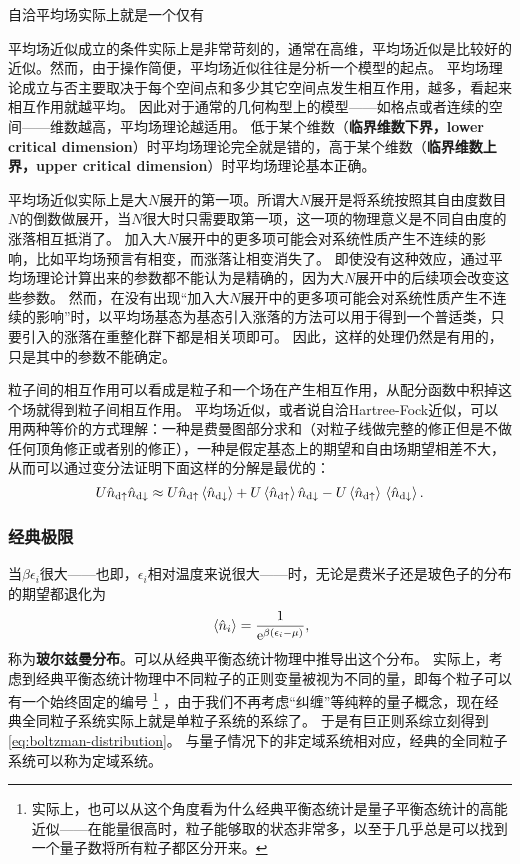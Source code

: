 \documentclass[hyperref, UTF8, a4paper]{ctexart}
\newcommand*{\ee}{\mathrm{e}}
\begin{document}
自洽平均场实际上就是一个仅有 %

平均场近似成立的条件实际上是非常苛刻的，通常在高维，平均场近似是比较好的近似。然而，由于操作简便，平均场近似往往是分析一个模型的起点。
平均场理论成立与否主要取决于每个空间点和多少其它空间点发生相互作用，越多，看起来相互作用就越平均。
因此对于通常的几何构型上的模型——如格点或者连续的空间——维数越高，平均场理论越适用。
低于某个维数（\textbf{临界维数下界，lower critical dimension}）时平均场理论完全就是错的，高于某个维数（\textbf{临界维数上界，upper critical dimension}）时平均场理论基本正确。

平均场近似实际上是大$N$展开的第一项。所谓大$N$展开是将系统按照其自由度数目$N$的倒数做展开，当$N$很大时只需要取第一项，这一项的物理意义是不同自由度的涨落相互抵消了。
加入大$N$展开中的更多项可能会对系统性质产生不连续的影响，比如平均场预言有相变，而涨落让相变消失了。
即使没有这种效应，通过平均场理论计算出来的参数都不能认为是精确的，因为大$N$展开中的后续项会改变这些参数。
然而，在没有出现“加入大$N$展开中的更多项可能会对系统性质产生不连续的影响”时，以平均场基态为基态引入涨落的方法可以用于得到一个普适类，只要引入的涨落在重整化群下都是相关项即可。
因此，这样的处理仍然是有用的，只是其中的参数不能确定。

粒子间的相互作用可以看成是粒子和一个场在产生相互作用，从配分函数中积掉这个场就得到粒子间相互作用。
平均场近似，或者说自洽Hartree-Fock近似，可以用两种等价的方式理解：一种是费曼图部分求和（对粒子线做完整的修正但是不做任何顶角修正或者别的修正），一种是假定基态上的期望和自由场期望相差不大，从而可以通过变分法证明下面这样的分解是最优的：
\begin{equation}
    U \hat{n}_{\text{d} \uparrow} \hat{n}_{\text{d} \downarrow} \approx U \hat{n}_{\text{d} \uparrow} \expval*{\hat{n}_{\text{d} \downarrow}} + U \expval*{\hat{n}_{\text{d} \uparrow}} \hat{n}_{\text{d} \downarrow} - U \expval*{\hat{n}_{\text{d} \uparrow}} \expval*{\hat{n}_{\text{d} \downarrow}}.
\end{equation}

\subsubsection{经典极限}

当$\beta \epsilon_i$很大——也即，$\epsilon_i$相对温度来说很大——时，无论是费米子还是玻色子的分布的期望都退化为
\begin{equation}
    \expval*{\hat{n}_i} = \frac{1}{\ee^{\beta (\epsilon_i - \mu)}},
    \label{eq:boltzman-distribution}
\end{equation}
称为\textbf{玻尔兹曼分布}。可以从经典平衡态统计物理中推导出这个分布。
实际上，考虑到经典平衡态统计物理中不同粒子的正则变量被视为不同的量，即每个粒子可以有一个始终固定的编号%
\footnote{实际上，也可以从这个角度看为什么经典平衡态统计是量子平衡态统计的高能近似——在能量很高时，粒子能够取的状态非常多，以至于几乎总是可以找到一个量子数将所有粒子都区分开来。}%
，由于我们不再考虑“纠缠”等纯粹的量子概念，现在经典全同粒子系统实际上就是单粒子系统的系综了。
于是有巨正则系综立刻得到\eqref{eq:boltzman-distribution}。
与量子情况下的非定域系统相对应，经典的全同粒子系统可以称为定域系统。
\end{document}
